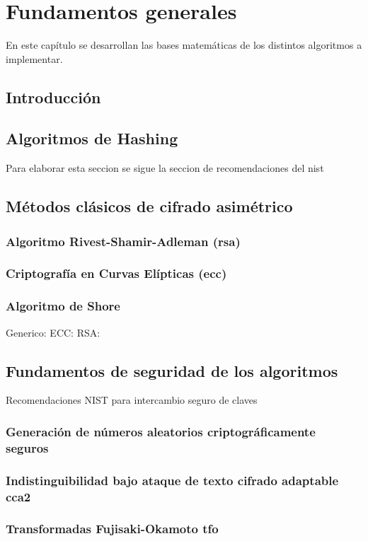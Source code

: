 \chapter{Fundamentos generales}
En este capítulo se desarrollan las bases matemáticas de los distintos algoritmos a implementar.
\section{Introducción}
\section{Algoritmos de Hashing }
Para elaborar esta seccion se sigue la seccion de recomendaciones del nist \cite{FIPS202}
\section{Métodos clásicos de cifrado asimétrico}
\subsection{Algoritmo Rivest-Shamir-Adleman (\gls{rsa})}
\subsection{Criptografía en Curvas Elípticas (\gls{ecc})}
\subsection{Algoritmo de Shore}
Generico: \cite{9508027v2} ECC: \cite{0301141v2} RSA: \cite{RESERCHFINAL}
\section{Fundamentos de seguridad de los algoritmos}
Recomendaciones NIST para intercambio seguro de claves \cite{NIST_SP_800_227_ipd_2025}
\subsection{Generación de números aleatorios criptográficamente seguros}
\subsection{Indistinguibilidad bajo ataque de texto cifrado adaptable \gls{cca2}}
\subsection{Transformadas Fujisaki-Okamoto \gls{tfo}}
\cite{Fujisaki1999}
\newpage
